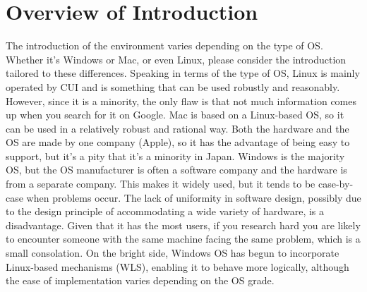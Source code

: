\documentclass{ltjsbook}
\begin{document}
\section{Overview of Introduction}
The introduction of the environment varies depending on the type of OS. Whether it's Windows or Mac, or even Linux, please consider the introduction tailored to these differences.
Speaking in terms of the type of OS, Linux is mainly operated by CUI and is something that can be used robustly and reasonably. However, since it is a minority, the only flaw is that not much information comes up when you search for it on Google.
Mac is based on a Linux-based OS, so it can be used in a relatively robust and rational way. Both the hardware and the OS are made by one company (Apple), so it has the advantage of being easy to support, but it's a pity that it's a minority in Japan.
Windows is the majority OS, but the OS manufacturer is often a software company and the hardware is from a separate company. This makes it widely used, but it tends to be case-by-case when problems occur. The lack of uniformity in software design, possibly due to the design principle of accommodating a wide variety of hardware, is a disadvantage. Given that it has the most users, if you research hard you are likely to encounter someone with the same machine facing the same problem, which is a small consolation. On the bright side, Windows OS has begun to incorporate Linux-based mechanisms (WLS), enabling it to behave more logically, although the ease of implementation varies depending on the OS grade.
\end{document}

